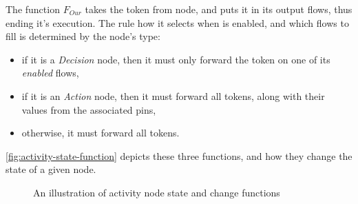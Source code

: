 \begin{definition}
The function \(F_{Our}\) takes the token from node, and puts it in its output flows, thus ending it's execution. The rule how it selects when is enabled, and which flows to fill is determined by the node's type:

\begin{itemize}
\item if it is a \emph{Decision} node, then it must only forward the token on one of its \emph{enabled} flows,
\item if it is an \emph{Action} node, then it must forward all tokens, along with their values from the associated pins,
\item otherwise, it must forward all tokens.
\end{itemize}

\end{definition}\label{def:activity-state-change}

\autoref{fig:activity-state-function} depicts these three functions, and how they change the state of a given node.

\begin{figure}[!ht]
	\centering
	
	\caption{An illustration of activity node state and change functions}
	\label{fig:activity-state-function}
\end{figure}
